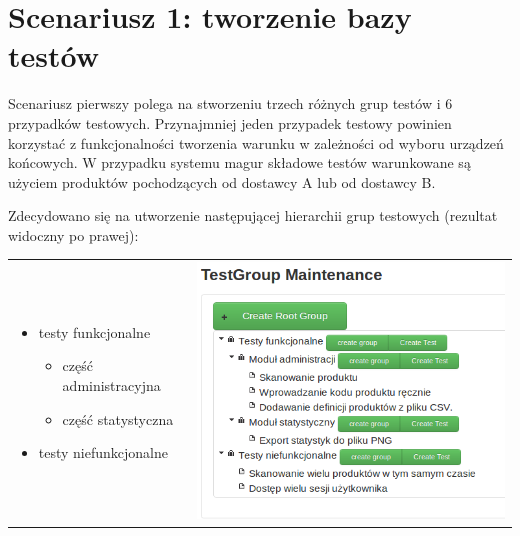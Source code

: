 \section{Scenariusz 1: tworzenie bazy testów}
Scenariusz pierwszy polega na stworzeniu trzech różnych grup testów i 6 przypadków testowych. Przynajmniej jeden przypadek testowy powinien korzystać z funkcjonalności tworzenia warunku w zależności od wyboru urządzeń końcowych. W przypadku systemu magur składowe testów warunkowane są użyciem produktów pochodzących od dostawcy A lub od dostawcy B.

Zdecydowano się na utworzenie następującej hierarchii grup testowych (rezultat widoczny po prawej):


\begin{tabular}{l l}
\begin{minipage}{0.5\textwidth}
\begin{itemize}
    \item testy funkcjonalne
    \begin{itemize}
      \item część administracyjna
      \item część statystyczna      
    \end{itemize}
    \item testy niefunkcjonalne
  \end{itemize}
\end{minipage}
&
\begin{minipage}{0.5\textwidth}
              \includegraphics[width=\linewidth]{img/screen/listaTestow.png}            
          
\end{minipage}

\end{tabular}

